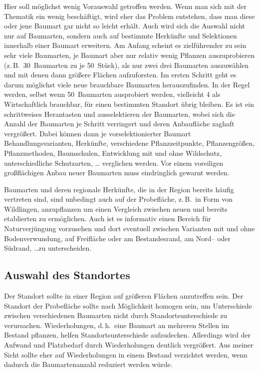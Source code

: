 \documentclass[twocolumn]{scrartcl}
\begin{document}
Hier soll möglichst wenig Vorauswahl getroffen werden. Wenn man sich mit der
Thematik ein wenig beschäftigt, wird eher das Problem entstehen, dass man diese
oder jene Baumart gar nicht so leicht erhält. Auch wird sich die Auswahl nicht
nur auf Baumarten, sondern auch auf bestimmte Herkünfte und Selektionen
innerhalb einer Baumart erweitern. Am Anfang scheint es zielführender zu sein
sehr viele Baumarten, je Baumart aber nur relativ wenig Pflanzen auszuprobieren
(z.\,B.\ 30~Baumarten zu je 50~Stück), als nur zwei drei Baumarten auszuwählen
und mit denen dann größere Flächen aufzuforsten. Im ersten Schritt geht es darum
möglichst viele neue brauchbare Baumarten herauszufinden. In der Regel werden,
selbst wenn 50~Baumarten ausprobiert werden, vielleicht 4 als Wirtschaftlich
brauchbar, für einen bestimmten Standort übrig bleiben. Es ist ein schrittweises
Herantasten und ausselektieren der Baumarten, wobei sich die Anzahl der
Baumarten je Schritt verringert und deren Anbaufläche zaghaft vergrößert. Dabei
können dann je vorselektionierter Baumart Behandlungsvarianten, Herkünfte,
verschiedene Pflanzzeitpunkte, Pflanzengrößen, Pflanzmethoden, Baumschulen,
Entwicklung mit und ohne Wildschutz, unterschiedliche Schutzarten, \dots
verglichen werden. Vor einem voreiligen großflächigen Anbau neuer Baumarten muss
eindringlich gewarnt werden.

Baumarten und deren regionale Herkünfte, die in der Region bereits häufig
vertreten sind, sind unbedingt auch auf der Probefläche, z.\,B.\ in Form von
Wildlingen, anzupflanzen um einen Vergleich zwischen neuen und bereits
etablierten zu ermöglichen. Auch ist es informativ einen Bereich für
Naturverjüngung vorzusehen und dort eventuell zwischen Varianten mit und ohne
Bodenverwundung, auf Freifläche oder am Bestandesrand, am Nord-- oder Südrand,
\dots zu unterscheiden.

\subsection{Auswahl des Standortes}

Der Standort sollte in einer Region auf größeren Flächen anzutreffen sein. Der
Standort der Probefläche sollte nach Möglichkeit homogen sein, um Unterschiede
zwischen verschiedenen Baumarten nicht durch Standortsunterschiede zu
verursachen. Wiederholungen, d.\,h.\ eine Baumart an mehreren Stellen im Bestand
pflanzen, helfen Standortsunterschiede aufzudecken. Allerdings wird der Aufwand
und Platzbedarf durch Wiederholungen deutlich vergrößert. Aus meiner Sicht
sollte eher auf Wiederholungen in einem Bestand verzichtet werden, wenn dadurch
die Baumartenanzahl reduziert werden würde.
\end{document}
